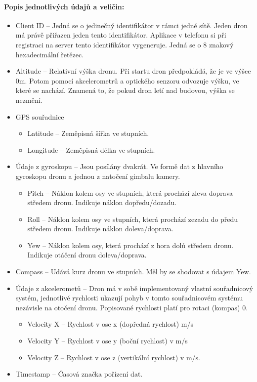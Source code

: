 \paragraph{\textnormal{Popis jednotlivých údajů a veličin:}}
\begin{itemize}
    \item Client ID -- Jedná se o jedinečný identifikátor v rámci jedné sítě. Jeden dron má právě přiřazen jeden tento identifikátor. Aplikace v telefonu si při registraci na server tento identifikátor vygeneruje. Jedná se o 8 znakový hexadecimální řetězec.
    \item  Altitude -- Relativní výška dronu. Při startu dron předpokládá, že je ve výšce 0m. Potom pomocí akcelerometrů a optického senzoru odvozuje výšku, ve které se nachází. Znamená to, že pokud dron letí nad budovou, výška se nezmění.
    \item GPS souřadnice
    \begin{itemize}
        \item Latitude -- Zeměpisná šířka ve stupních.
        \item Longitude -- Zeměpisná délka ve stupních.
    \end{itemize}

    \item Údaje z gyroskopu -- Jsou posílány dvakrát. Ve formě dat z hlavního gyroskopu dronu a jednou z natočení gimbalu kamery. %
    \begin{itemize}
        \item Pitch -- Náklon kolem osy  ve stupních, která prochází zleva doprava středem dronu. Indikuje náklon dopředu/dozadu.
        \item Roll --  Náklon kolem osy  ve stupních, která prochází zezadu do předu středem dronu. Indikuje náklon doleva/doprava.
        \item Yew -- Náklon kolem osy, která prochází z hora dolů  středem dronu. Indikuje otáčení dronu doleva/doprava.
    \end{itemize}
    \item Compass -- Udává kurz dronu ve stupních. Měl by se shodovat s údajem Yew.
    \item Údaje z akcelerometů -- Dron má v sobě implementovaný vlastní souřadnicový systém, jednotlivé rychlosti ukazují pohyb v tomto souřadnicovém systému nezávisle na otočení dronu. Popisované rychlosti platí pro rotaci (kompas) 0.
    \begin{itemize}
        \item Velocity X -- Rychlost v ose x (dopředná rychlost) m/s
        \item Velocity Y -- Rychlost v ose y (boční rychlost) v m/s
        \item Velocity Z -- Rychlost v ose z (vertikální rychlost) v m/s.
     \end{itemize}
     \item Timestamp -- Časová značka pořízení dat.
\end{itemize}

